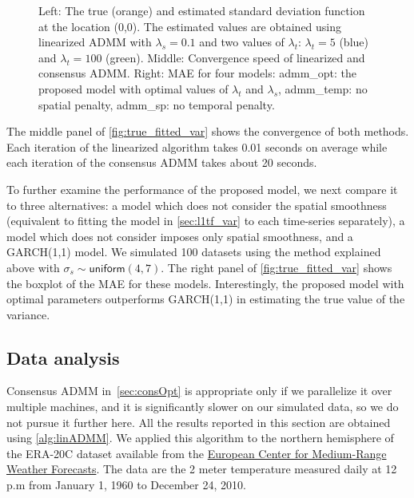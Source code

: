 \documentclass{article}
\begin{document}
\begin{figure}[tb]
  \caption{Left: The true (orange) and estimated standard deviation 
    function at the location (0,0). The estimated values are
    obtained using linearized ADMM with $\lambda_s=0.1$ and two
    values of $\lambda_t$: $\lambda_t=5$ (blue) and
    $\lambda_t=100$ (green). Middle: Convergence speed of linearized and consensus ADMM. Right: MAE for four models: admm\_opt: the proposed model with optimal values of $\lambda_t$ and $\lambda_s$, admm\_temp: no spatial penalty, admm\_sp: no temporal penalty.} \label{fig:true_fitted_var}
\end{figure}

The middle panel of \autoref{fig:true_fitted_var} shows the
convergence of both methods. Each iteration of the linearized
algorithm takes 0.01 seconds on average while each iteration of the
consensus ADMM takes about 20 seconds. 

To further examine the performance of the proposed model, we next
compare it to three alternatives: a model which does not consider the
spatial smoothness (equivalent to fitting the model in
\autoref{sec:l1tf_var} to each time-series separately), a model which
does not consider imposes only spatial smoothness, and a GARCH(1,1) model. We
simulated 100 datasets using the method explained above with $\sigma_s
\sim \mathsf{uniform}(4,7)$. The right panel of
\autoref{fig:true_fitted_var} shows the boxplot of the MAE for these
models. Interestingly, the proposed model with optimal parameters
outperforms GARCH(1,1) in estimating the true value of the variance.    


\subsection{Data analysis}
\label{sec:data}

Consensus ADMM in~\autoref{sec:consOpt} is appropriate only if
we parallelize it over multiple machines, and it is significantly
slower on our simulated data, so we do not pursue it
further here. All the results reported in this section are obtained
using \autoref{alg:linADMM}. We
applied this algorithm to the northern hemisphere of the ERA-20C
dataset available from the \href {https://www.ecmwf.int}{European Center for Medium-Range
  Weather Forecasts}. The data are
the 2 meter temperature measured daily at 12 p.m from January 1, 1960
to December 24, 2010. 
\end{document}
